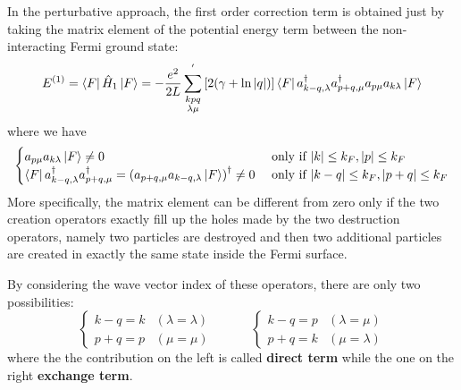 \documentclass[11pt, a4paper, twoside, openright]{article}
\begin{document}
\begin{itemize}
In the perturbative approach, the first order correction term is obtained just by taking the matrix element of the potential energy term between the non-interacting Fermi ground state:
\begin{equation*}
  E^{(1)} = \bra{F} \hat{H}_1 \ket{F}
  =   - \frac{e^2}{2L} \sum_{\substack{k p q \\ \lambda \mu  } }^{'} \qty[  2 \qty( \gamma + \ln{\abs{q } }  ) ]
    \bra{F} a_{k-q, \lambda } ^\dag a_{p+q,\mu }^\dag  a_{p\mu } a_{k \lambda } \ket{F}
\end{equation*}
where we have
\begin{equation*}
  \begin{cases}
     a_{p \mu } a_{k \lambda } \ket{F}  \neq 0 &  \text{ only if } \abs{k} \le k_F, \abs{p} \le k_F \\
     \bra{F} a_{k - q, \lambda }^\dag a_{p+q, \mu } ^\dag = \qty(  a_{p+q, \mu } a_{k-q, \lambda } \ket{F} ) ^\dag \neq 0
     & \text{ only if } \abs{k - q} \le k_F, \abs{p + q} \le k_F
  \end{cases}
\end{equation*}
More specifically, the matrix element can be different from zero only if the two creation operators exactly fill up the holes made by the two destruction operators, namely two particles are destroyed and then two additional particles are created in exactly the same state inside the Fermi surface.







By considering the wave vector index of these operators, there are only two possibilities:
\begin{equation*}
  \begin{cases}
   k-q = k &(\lambda = \lambda )\\
   p+q = p &(\mu = \mu )
  \end{cases}
  \quad \quad \quad
  \begin{cases}
   k-q = p & (\lambda = \mu )\\
   p+q = k & (\mu = \lambda )
  \end{cases}
\end{equation*}
where the the contribution on the left is called \textbf{direct term} while the one on the right \textbf{exchange term}.


\end{itemize}
\end{document}
